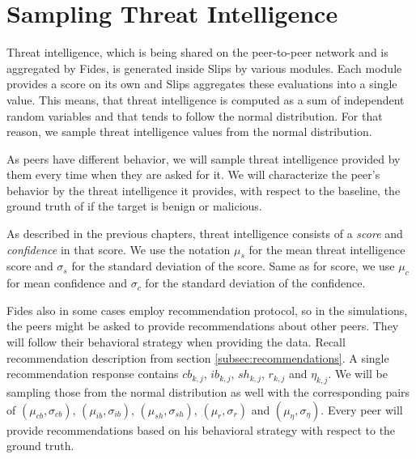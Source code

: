 \section{Sampling Threat Intelligence}
\label{sec:sampling-threat-intelligence}
Threat intelligence, which is being shared on the peer-to-peer network and is aggregated by Fides, is generated inside Slips by various modules.
Each module provides a score on its own and Slips aggregates these evaluations into a single value. 
This means, that threat intelligence is computed as a sum of independent random variables and that tends to follow the normal distribution. 
For that reason, we sample threat intelligence values from the normal distribution.

As peers have different behavior, we will sample threat intelligence provided by them every time when they are asked for it.
We will characterize the peer's behavior by the threat intelligence it provides, with respect to the baseline, the ground truth of if the target is benign or malicious.

As described in the previous chapters, threat intelligence consists of a \textit{score} and \textit{confidence} in that score.
We use the notation $\mu_{s}$ for the mean threat intelligence score and $\sigma_{s}$ for the standard deviation of the score. 
Same as for score, we use $\mu_{c}$ for mean confidence and $\sigma_{c}$ for the standard deviation of the confidence. 

Fides also in some cases employ recommendation protocol, so in the simulations, the peers might be asked to provide recommendations about other peers.
They will follow their behavioral strategy when providing the data. 
Recall recommendation description from section \ref{subsec:recommendations}. A single recommendation response contains $cb_{k,j}$, $ib_{k,j}$, $sh_{k,j}$, $r_{k,j}$ and $\eta_{k,j}$. 
We will be sampling those from the normal distribution as well with the corresponding pairs of $(\mu_{cb}, \sigma_{cb})$, $(\mu_{ib}, \sigma_{ib})$, $(\mu_{sh}, \sigma_{sh})$, $(\mu_{r}, \sigma_{r})$ and $(\mu_{\eta}, \sigma_{\eta})$.
Every peer will provide recommendations based on his behavioral strategy with respect to the ground truth.

